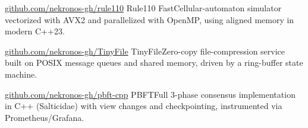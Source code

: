 \documentclass[11pt, a4paper]{cv}
\begin{document}
\begin{cventries}
  \cventry
    {\href{https://github.com/nekronos-gh/rule110}{github.com/nekronos-gh/rule110}}
    {Rule110 Fast}{}{}{Cellular-automaton simulator vectorized with AVX2 and parallelized with OpenMP, using aligned memory in modern C++23.}

  \cventry
    {\href{https://github.com/nekronos-gh/TinyFile}{github.com/nekronos-gh/TinyFile} }
    {TinyFile}{}{}{Zero-copy file-compression service built on POSIX message queues and shared memory, driven by a ring-buffer state machine.}

  \cventry
    {\href{https://github.com/nekronos-gh/pbft-cpp}{github.com/nekronos-gh/pbft-cpp} }
    {PBFT}{}{}{Full 3-phase consensus implementation in C++ (Salticidae) with view changes and checkpointing, instrumented via Prometheus/Grafana.}
\end{cventries}

\end{document}
